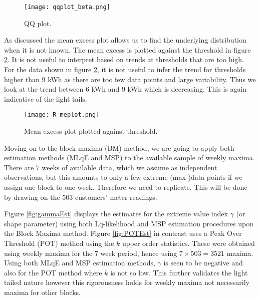 \documentclass[a4paper]{article}
\begin{document}
\begin{figure}
\centering
\texttt{[image: qqplot\_beta.png]}
\caption{\label{fig:beta} QQ plot.}
\end{figure}


As discussed the mean excess plot allows us to find the underlying distribution when it is not known. The mean excess is plotted against the threshold in figure \ref{fig:r_me}. It is not useful to interpret based on trends at thresholds that are too high. For the data shown in figure \ref{fig:r_me}, it is not useful to infer the trend for thresholds higher than 9 kWh as there are too few data points and large variability. Thus we look at the trend between 6 kWh and 9 kWh which is decreasing. This is again indicative of the light tails.

\begin{figure}
\centering
\texttt{[image: R\_meplot.png]}
\caption{\label{fig:r_me} Mean excess plot plotted against threshold.}
\end{figure}

Moving on to the block maxima (BM) method, we are going to apply both estimation methods (MLqE and MSP) to the available sample of weekly maxima. There are 7 weeks of available data, which we assume as independent observations, but this amounts to only a few extreme (max-)data points if we assign one block to one week. Therefore we need to replicate. This will be done by drawing on the 503 customers' meter readings.

Figure \ref{fig:gammaEst} displays the estimates for the extreme value index $\gamma$ (or shape parameter) using both Lq-likelihood and MSP estimation procedures upon the Block Maxima method. Figure \ref{fig:POTEst} in contrast uses a Peak Over Threshold (POT) method using the $k$ upper order statistics. These were obtained using weekly maxima for the 7 week period, hence using $7\times 503= 3521$ maxima. Using both MLqE and MSP estimation methods, $\gamma$ is seen to be negative and also for the POT method where $k$ is not so low. This further validates the light tailed nature however this rigorousness holds for weekly maxima not necessarily maxima for other blocks. 
\end{document}

